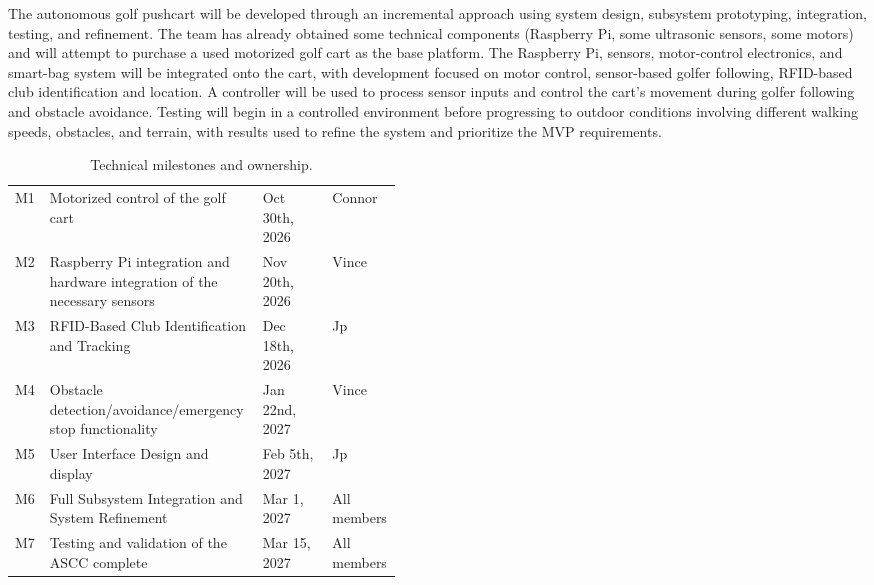 \label{sec:design}
The autonomous golf pushcart will be developed through an incremental approach using system design, subsystem prototyping, integration, testing, and refinement. The team has already obtained some technical components (Raspberry Pi, some ultrasonic sensors, some motors) and will attempt to purchase a used motorized golf cart as the base platform. The Raspberry Pi, sensors, motor-control electronics, and smart-bag system
will be integrated onto the cart, with development focused on motor control, sensor-based
golfer following, RFID-based club identification and location. A controller will be used to
process sensor inputs and control the cart’s movement during golfer following and obstacle avoidance. Testing will begin in a controlled environment before progressing to
outdoor conditions involving different walking speeds, obstacles, and terrain, with results
used to refine the system and prioritize the MVP requirements.



\begin{singlespace}
\setlength{\LTcapwidth}{\linewidth}
\begin{longtable}{@{}L{0.09\linewidth} L{\tabcolsep\relax} L{0.18\linewidth} L{0.18\linewidth}@{}}
\caption{Technical milestones and ownership.}\label{tab:proposal-milestones}\\
 &  &  & \\
\midrule
\endfirsthead
\endhead
\bottomrule
\endfoot
M1 & Motorized control of the golf cart & Oct 30th, 2026 & Connor \\
\addlinespace[3pt]
M2 & Raspberry Pi integration and hardware integration of the necessary sensors & Nov 20th, 2026 & Vince \\
\addlinespace[3pt]
M3 & RFID-Based Club Identification and Tracking & Dec 18th, 2026 & Jp \\
\addlinespace[3pt]
M4 &  Obstacle detection/avoidance/emergency stop functionality & Jan 22nd, 2027 & Vince \\
\addlinespace[3pt]
M5 & User Interface Design and display & Feb 5th, 2027 & Jp \\
\addlinespace[3pt]
M6 & Full Subsystem Integration and System Refinement & Mar 1, 2027 & All members \\
\addlinespace[3pt]
M7 & Testing and validation of the ASCC complete & Mar 15, 2027 & All members \\
\end{longtable}
\end{singlespace}

